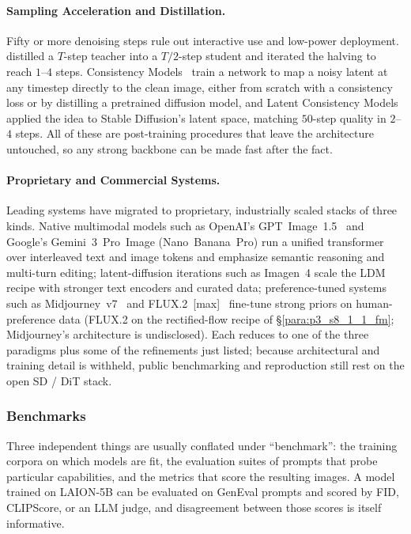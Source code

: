 \paragraph{Sampling Acceleration and Distillation.}
Fifty or more denoising steps rule out interactive use and low-power deployment.
\citet{salimans2022progressive} distilled a $T$-step teacher into a $T/2$-step student and iterated the halving to reach $1$--$4$ steps.
Consistency Models~\cite{song2023consistency} train a network to map a noisy latent at any timestep directly to the clean image, either from scratch with a consistency loss or by distilling a pretrained diffusion model, and Latent Consistency Models~\cite{lcm2023} applied the idea to Stable Diffusion's latent space, matching $50$-step quality in $2$--$4$ steps.
All of these are post-training procedures that leave the architecture untouched, so any strong backbone can be made fast after the fact.

\paragraph{Proprietary and Commercial Systems.}
Leading systems have migrated to proprietary, industrially scaled stacks of three kinds.
Native multimodal models such as OpenAI's GPT~Image~1.5~\cite{openai2025images} and Google's Gemini~3~Pro~Image (Nano~Banana~Pro) run a unified transformer over interleaved text and image tokens and emphasize semantic reasoning and multi-turn editing; latent-diffusion iterations such as Imagen~4 scale the LDM recipe with stronger text encoders and curated data; preference-tuned systems such as Midjourney~v7~\cite{midjourney_v7_alpha} and FLUX.2~[max]~\cite{bfl_flux2_max} fine-tune strong priors on human-preference data (FLUX.2 on the rectified-flow recipe of §\ref{para:p3_s8_1_1_fm}; Midjourney's architecture is undisclosed).
Each reduces to one of the three paradigms plus some of the refinements just listed; because architectural and training detail is withheld, public benchmarking and reproduction still rest on the open SD / DiT stack.

\subsubsection{Benchmarks}
Three independent things are usually conflated under ``benchmark'': the training corpora on which models are fit, the evaluation suites of prompts that probe particular capabilities, and the metrics that score the resulting images.
A model trained on LAION-5B can be evaluated on GenEval prompts and scored by FID, CLIPScore, or an LLM judge, and disagreement between those scores is itself informative.

